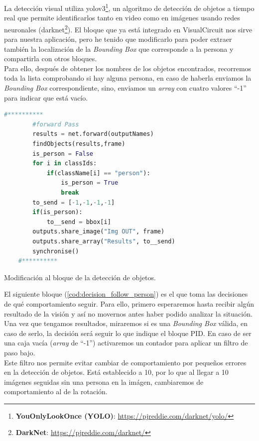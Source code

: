 La detección visual utiliza yolov3\footnote{\textbf{YouOnlyLookOnce (YOLO)}: \url{https://pjreddie.com/darknet/yolo/}},
un algoritmo de detección de objetos a tiempo real que permite identificarlos tanto en video como en imágenes usando redes neuronales
(darknet\footnote{\textbf{DarkNet}: \url{https://pjreddie.com/darknet/}}). El bloque que ya está integrado en VisualCircuit nos sirve para nuestra aplicación,
pero he tenido que modificarlo para poder extraer también la localización de la \textit{Bounding Box} que corresponde a la persona y compartirla con otros bloques.\\

Para ello, después de obtener los nombres de los objetos encontrados, recorremos toda la lista comprobando si hay alguna persona,
en caso de haberla enviamos la \textit{Bounding Box} correspondiente, sino, enviamos un \textit{array} con cuatro valores ``-1'' para indicar que está vacío.

\begin{code}[H]
    \begin{lstlisting}[language=python]
    #**********
        #forward Pass
        results = net.forward(outputNames)
        findObjects(results,frame)
        is_person = False
        for i in classIds:
            if(className[i] == "person"):
                is_person = True
                break
        to_send = [-1,-1,-1,-1]
        if(is_person):
            to__send = bbox[i]
        outputs.share_image("Img OUT", frame)
        outputs.share_array("Results", to__send)
        synchronise()
    #**********
    \end{lstlisting}
    \caption[Modificación al bloque detector de objetos]{Modificación al bloque de la detección de objetos.}
    \label{cod:mod_object_detector}
\end{code}

El siguiente bloque (\ref{cod:decision_follow_person}) es el que toma las decisiones de qué comportamiento seguir.
Para ello, primero esperaremos hasta recibir algún resultado de la visión y así no movernos antes haber podido analizar la situación.\\
Una vez que tengamos resultados, miraremos si es una \textit{Bounding Box} válida, en caso de serlo, la decisión será seguir lo que indique el bloque PID.
En caso de ser una caja vacía (\textit{array} de ``-1'') activaremos un contador para aplicar un filtro de paso bajo.\\
Este filtro nos permite evitar cambiar de comportamiento por pequeños errores en la detección de objetos.
Está establecido a 10, por lo que al llegar a 10 imágenes seguidas sin una persona en la imágen, cambiaremos de comportamiento al de la rotación.\\

